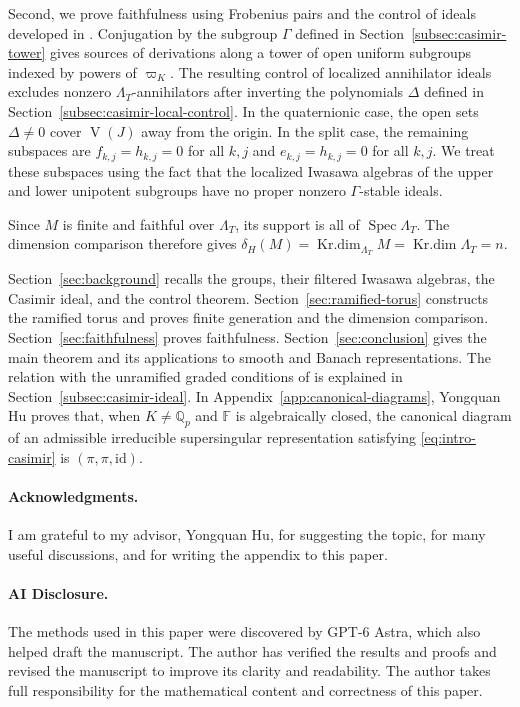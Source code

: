 \documentclass[11pt]{article}
\numberwithin{equation}{section}
\theoremstyle{definition}
\theoremstyle{remark}
\newcommand{\F}{\mathbb F}
\newcommand{\Q}{\mathbb Q}
\DeclareMathOperator{\Spec}{Spec}
\DeclareMathOperator{\Krdim}{Kr.dim}
\begin{document}
Second, we prove faithfulness using Frobenius pairs and the control
of ideals developed in \cite{AWZ08,AW09}. Conjugation by the subgroup
$\Gamma$ defined in Section~\ref{subsec:casimir-tower} gives sources of
derivations along a tower of open uniform subgroups indexed by powers
of $\varpi_K$. The resulting
control of localized annihilator ideals excludes nonzero
$\Lambda_T$-annihilators after inverting the polynomials $\Delta$ defined
in Section~\ref{subsec:casimir-local-control}. In the quaternionic
case, the open sets $\Delta\ne0$ cover $\operatorname{V}(J)$ away from
the origin. In the split case, the remaining subspaces are
$f_{k,j}=h_{k,j}=0$ for all $k,j$ and
$e_{k,j}=h_{k,j}=0$ for all $k,j$. We treat these subspaces using
the fact that the localized Iwasawa algebras of the upper and lower
unipotent subgroups have no proper nonzero $\Gamma$-stable ideals.

Since $M$ is finite and faithful over $\Lambda_T$, its support is all of
$\Spec \Lambda_T$. The dimension comparison therefore gives
$\delta_H(M)=\Krdim_{\Lambda_T} M=\Krdim \Lambda_T=n$.

Section~\ref{sec:background} recalls the groups, their filtered
Iwasawa algebras, the Casimir ideal, and the control theorem.
Section~\ref{sec:ramified-torus} constructs the ramified torus and
proves finite generation and the dimension comparison.
Section~\ref{sec:faithfulness} proves faithfulness.
Section~\ref{sec:conclusion} gives the main theorem and its
applications to smooth and Banach representations. The relation
with the unramified graded conditions of \cite{BHH23,HW24,Sor26a}
is explained in Section~\ref{subsec:casimir-ideal}.
In Appendix~\ref{app:canonical-diagrams}, Yongquan Hu proves that,
when $K\ne\Q_p$ and $\F$ is algebraically closed, the canonical
diagram of an admissible irreducible supersingular representation
satisfying \eqref{eq:intro-casimir} is $(\pi,\pi,\mathrm{id})$.

\paragraph*{Acknowledgments.} 
I am grateful to my advisor, Yongquan Hu, for suggesting the topic, for many useful discussions, and for writing the appendix to this paper.


\paragraph*{AI Disclosure.}
The methods used in this paper were discovered by GPT-6 Astra,  
which also helped draft the manuscript. 
The author has verified the results and proofs and revised the manuscript
to improve its clarity and readability. The author takes full responsibility
for the mathematical content and correctness of this paper.
\end{document}
